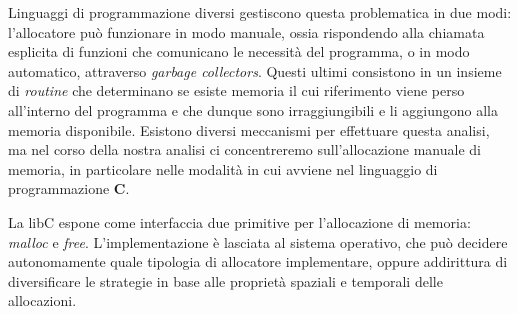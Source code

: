 Linguaggi di programmazione diversi gestiscono questa problematica in due modi: l'allocatore può funzionare in modo manuale, ossia rispondendo alla chiamata esplicita di funzioni che comunicano le necessità del programma, o in modo automatico, attraverso \textit{garbage collectors}. Questi ultimi consistono in un insieme di \textit{routine} che determinano se esiste memoria il cui riferimento viene perso all'interno del programma e che dunque sono irraggiungibili e li aggiungono alla memoria disponibile. Esistono diversi meccanismi per effettuare questa analisi, ma nel corso della nostra analisi ci concentreremo sull'allocazione manuale di memoria, in particolare nelle modalità in cui avviene nel linguaggio di programmazione \textbf{C}. 

La libC espone come interfaccia due primitive per l'allocazione di memoria: \textit{malloc} e \textit{free}. L'implementazione è lasciata al sistema operativo, che può decidere autonomamente quale tipologia di allocatore implementare, oppure addirittura di diversificare le strategie in base alle proprietà spaziali e temporali delle allocazioni.